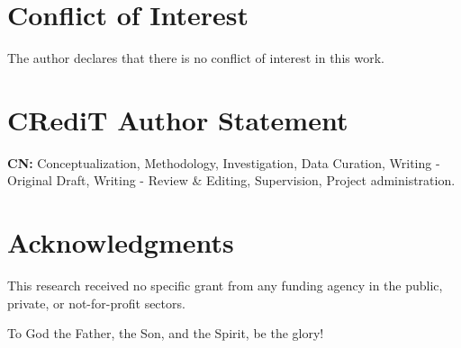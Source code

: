 
\section*{Conflict of Interest}

    The author declares that there is no conflict of interest in this work.



\section*{CRediT Author Statement}

    \textbf{CN:} Conceptualization, Methodology, Investigation, Data Curation, Writing - Original Draft,  Writing  -  Review  \&
    Editing, Supervision, Project administration.



\section*{Acknowledgments}

    This research received no specific grant from any funding agency in the public, private, or not-for-profit sectors.

    To \YA{} God the Father, the Son, and the Spirit, be the glory!




